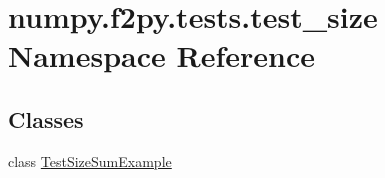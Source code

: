 \hypertarget{namespacenumpy_1_1f2py_1_1tests_1_1test__size}{}\section{numpy.\+f2py.\+tests.\+test\+\_\+size Namespace Reference}
\label{namespacenumpy_1_1f2py_1_1tests_1_1test__size}
\subsection*{Classes}
\begin{DoxyCompactItemize}
\item 
class \hyperlink{classnumpy_1_1f2py_1_1tests_1_1test__size_1_1TestSizeSumExample}{Test\+Size\+Sum\+Example}
\end{DoxyCompactItemize}
